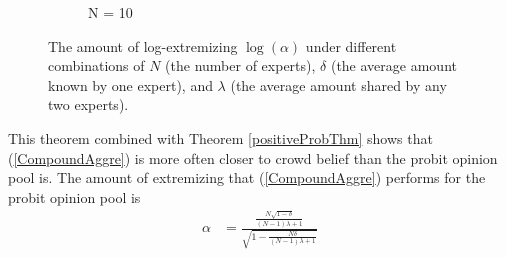 \documentclass[11pt]{article}
\theoremstyle{definition}
\theoremstyle{definition}
\begin{document}
\begin{figure}[t]
\begin{subfigure}[b]{0.499\textwidth}
\caption{N = 10}
\label{ExtremeN10}
        \end{subfigure}
        \caption{ The amount of log-extremizing $\log(\alpha)$ under different combinations of $N$ (the number of experts), $\delta$ (the average amount known by one expert), and $\lambda$ (the average amount shared by any two experts).}
        \label{Levelplots}
\end{figure}
 

This theorem combined with Theorem \ref{positiveProbThm} shows that (\ref{CompoundAggre}) is more often closer to crowd belief than the probit opinion pool is. The amount of extremizing that (\ref{CompoundAggre}) performs for the probit opinion pool is
\begin{align}
\alpha &= \frac{\frac{N\sqrt{1-\delta}}{(N-1)\lambda +1}}{\sqrt{1- \frac{N\delta}{(N-1)\lambda +1} }} \label{CompoundAlpha}
\end{align}
\end{document}
